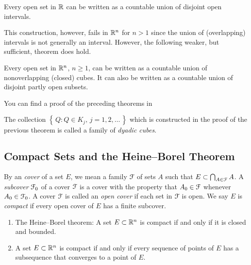 \begin{theorem}[1.10.]
Every open set in $\mathbb{R}$ can be written as a countable union of disjoint
open intervals.
\end{theorem}

This construction, however, fails in $\mathbb{R}^n$ for $n>1$ since the union of
(overlapping) intervals is not generally an interval. However, the
following weaker, but sufficient, theorem does hold.
\begin{theorem}
Every open set in $\mathbb{R}^n$, $n\geq 1$, can be written as a countable union
of nonoverlapping (closed) cubes. It can also be written as a countable
union of disjoint partly open subsets.
\end{theorem}
You can find a proof of the preceding theorems in \cite{book:wheeden-zygmund}

The collection $\left\{\,Q:\text{$Q\in K_j$, $j=1,2,\dotsc$}\,\right\}$
which is constructed in the proof of the previous theorem is called a
family of \emph{dyadic cubes}.

\subsection{Compact Sets and the Heine--Borel Theorem}
By an \emph{cover} of a set $E$, we mean a family $\mathcal{F}$ of sets $A$ such
that $E\subset\bigcap_{A\in\mathcal{F}} A$. A \emph{subcover} $\mathcal{F}_0$ of a
cover $\mathcal{F}$ is a cover with the property that $A_0\in\mathcal{F}$ whenever
$A_0\in\mathcal{F}_0$. A cover $\mathcal{F}$ is called an \emph{open cover} if each set
in $\mathcal{F}$ is open. We say $E$ is \emph{compact} if every open cover of $E$
has a finite subcover.

\begin{theorem}[1.12]
\hfill
\begin{enumerate}[label=\textnormal{(\alph*)},noitemsep]
\item The Heine--Borel theorem: A set $E\subset\mathbb{R}^n$ is compact if and
  only if it is closed and bounded.
\item A set $E\subset\mathbb{R}^n$ is compact if and only if every sequence of
  points of $E$ has a subsequence that converges to a point of $E$.
\end{enumerate}
\end{theorem}

